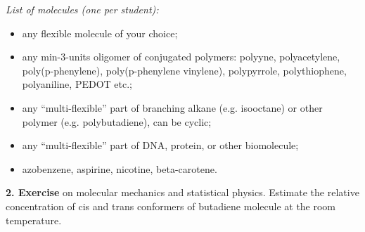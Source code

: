 \documentclass{homework}
\begin{document}
\medskip

\textit{List of molecules (one per student):}
\begin{itemize}\setlength{\itemsep}{0ex}
\item any flexible molecule of your choice;
\item any min-3-units oligomer of conjugated polymers: polyyne, polyacetylene, poly(p-phenylene), poly(p-phenylene vinylene), polypyrrole, polythiophene, polyaniline, PEDOT etc.;
\item any ``multi-flexible'' part of branching alkane (e.g. isooctane) or other polymer (e.g. polybutadiene), can be cyclic;
\item any ``multi-flexible'' part of DNA, protein, or other biomolecule;
\item azobenzene, aspirine, nicotine, beta-carotene.
\end{itemize}

\bigskip

\textbf{2. Exercise} on molecular mechanics and statistical physics. Estimate the relative concentration of cis and trans conformers of butadiene molecule at the room temperature.
\end{document}
